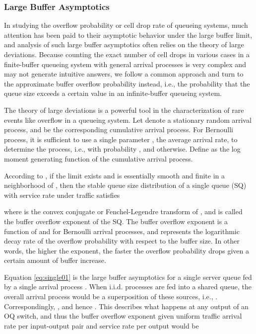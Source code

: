\documentclass[journal,final,doublecolumn,10pt,twoside]{IEEEtranTCOM} \normalsize
\begin{document}
\subsubsection{Large Buffer Asymptotics}
\label{sec:largebuffer}
In studying the overflow probability or cell drop rate of queueing systems, much attention has been paid to their asymptotic behavior under the large buffer limit, and analysis of such large buffer asymptotics often relies on the theory of large deviations. Because counting the exact number of cell drops in various cases in a finite-buffer queueing system with general arrival processes is very complex and may not generate intuitive answers, we follow a common approach and turn to the approximate buffer overflow probability instead, i.e., the probability that the queue size  exceeds a certain value in an infinite-buffer queueing system.

The theory of large deviations is a powerful tool in the characterization of rare events like overflow in a queueing system. Let  denote a stationary random arrival process, and  be the corresponding cumulative arrival process. For Bernoulli process, it is sufficient to use a single parameter , the average arrival rate, to determine the process, i.e.,  with probability , and  otherwise. Define  as the log moment generating function of the cumulative arrival process. 

According to \cite{bigqueues}, if the limit  exists and is essentially smooth and finite in a neighborhood of , then the stable queue size distribution of a single queue (SQ) with service rate  under traffic  satisfies

where  is the convex conjugate or Fenchel-Legendre transform of , and  is called the buffer overflow exponent of the SQ. The buffer overflow exponent is a function of  and  for Bernoulli arrival processes, and represents the logarithmic decay rate of the overflow probability with respect to the buffer size. In other words, the higher the exponent, the faster the overflow probability drops given a certain amount of buffer increase.



Equation \ref{eq:single01} is the large buffer asymptotics for a single server queue fed by a single arrival process . When  i.i.d. processes are fed into a shared queue, the overall arrival process would be a superposition of these sources, i.e., . Correspondingly, , and hence . This describes what happens at any output of an  OQ switch, and thus the buffer overflow exponent given uniform traffic arrival rate  per input-output pair and service rate  per output would be 
\end{document}
